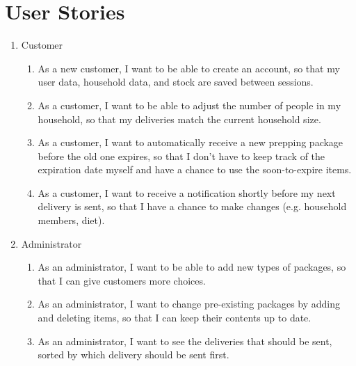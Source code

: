 \documentclass[a4paper,11pt]{article}
\begin{document}
\section{User Stories}
\begin{enumerate}
    \item Customer
    \begin{enumerate}[label=\theenumi.\arabic*]
        \item As a new customer, I want to be able to create an account, so that my user data, household data, and stock are saved between sessions.

        \item As a customer, I want to be able to adjust the number of people in my household, so that my deliveries match the current household size.

        \item As a customer, I want to automatically receive a new prepping package before the old one expires, so that I don't have to keep track of the expiration date myself and have a chance to use the soon-to-expire items.

        \item As a customer, I want to receive a notification shortly before my next delivery is sent, so that I have a chance to make changes (e.g. household members, diet).
    \end{enumerate}

    \item Administrator
    \begin{enumerate}[label=\theenumi.\arabic*]
        \item As an administrator, I want to be able to add new types of packages, so that I can give customers more choices.

        \item As an administrator, I want to change pre-existing packages by adding and deleting items, so that I can keep their contents up to date.

        \item As an administrator, I want to see the deliveries that should be sent, sorted by which delivery should be sent first.
    \end{enumerate}
\end{enumerate}
\end{document}

